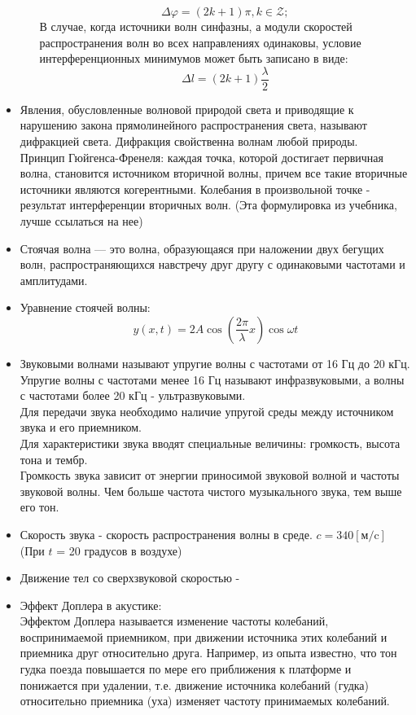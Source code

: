 \documentclass{article}
\begin{document}
\begin{flushleft}
\begin{itemize}
\begin{enumerate}
\[            \Delta \varphi = (2k + 1)\pi,k\in \mathcal{Z};
            \]
            В случае, когда источники волн синфазны, а модули скоростей распространения волн во всех направлениях одинаковы, условие интерференционных минимумов может быть записано в виде: \[
            \Delta l = (2k + 1)\frac{\lambda}{2}
            \]
        \end{enumerate}
        \item Явления, обусловленные волновой природой света и приводящие к нарушению закона прямолинейного распространения света, называют дифракцией света. Дифракция свойственна волнам любой природы.
        \\Принцип Гюйгенса-Френеля: каждая точка, которой достигает первичная волна, становится источником вторичной волны, причем все такие вторичные источники являются когерентными. Колебания в произвольной точке - результат интерференции вторичных волн. (Эта формулировка из учебника, лучше ссылаться на нее)
        \item Стоячая волна — это волна, образующаяся при наложении двух бегущих волн, распространяющихся навстречу друг другу с одинаковыми частотами и амплитудами.
        \item Уравнение стоячей волны:
        \[
        y(x,t) = 2A\cos(\frac{2\pi}{\lambda}x)\cos{\omega t}
        \]
        \item Звуковыми волнами называют упругие волны с частотами от 16 Гц до 20 кГц. Упругие волны с частотами менее 16 Гц называют инфразвуковыми, а волны с частотами более 20 кГц - ультразвуковыми.
        \\ Для передачи звука необходимо наличие упругой среды между источником звука и его приемником.
        \\Для характеристики звука вводят специальные величины: громкость, высота тона и тембр.
        \\Громкость звука зависит от энергии приносимой звуковой волной и частоты звуковой волны. Чем больше частота чистого музыкального звука, тем выше его тон.
        \item Скорость звука - скорость распространения волны в среде. $c = 340 [\text{м/c}]$ (При $t$ = 20 градусов в воздухе)
        \item Движение тел со сверхзвуковой скоростью -
        \item Эффект Доплера в акустике:
        \\ Эффектом Доплера называется изменение частоты колебаний, воспринимаемой приемником, при движении источника этих колебаний и приемника друг относительно друга. Например, из опыта известно, что тон гудка поезда повышается по мере его приближения к платформе и понижается при удалении, т.е. движение источника колебаний (гудка) относительно приемника (уха) изменяет частоту принимаемых колебаний.

\end{itemize}
\end{flushleft}
\end{document}
